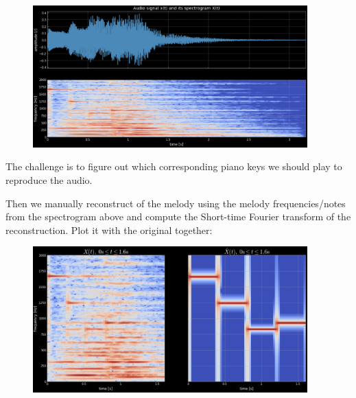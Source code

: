 \begin{figure}[ht]
    \centering
    \includegraphics[width=300pt]{labs/04/images/2.png}
    \label{fig:spectrogram}
\end{figure}

The challenge is to figure out which corresponding piano keys we should play to reproduce the audio.

Then we manually reconstruct of the melody using the melody frequencies/notes from the spectrogram above and compute the Short-time Fourier transform of the reconstruction. Plot it with the original together:
\begin{figure}[ht]
    \centering
    \includegraphics[width=300pt]{labs/04/images/3.png}
    \label{fig:spectrograms of original and reconstruction}
\end{figure}
